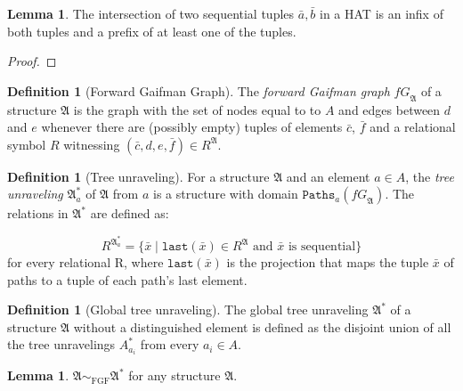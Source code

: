 \documentclass[draft]{scrartcl}
\theoremstyle{definition}
\newtheorem{definition}[theorem]{Definition}
\newtheorem{lemma}[theorem]{Lemma}
\newcommand{\last}[1]{\mathtt{last}(#1)}
\begin{document}
\begin{lemma}\label{lemma-seq-intersection}
The intersection of two sequential tuples $\bar{a}, \bar{b}$ in a HAT is an infix of both tuples and a prefix of at least one of the tuples.
\end{lemma}

\begin{proof}
\end{proof}

\begin{definition}[Forward Gaifman Graph]
The \emph{forward Gaifman graph} $\mathit{fG}_\mathfrak{A}$ of a structure $\mathfrak{A}$ is the graph with the set of nodes equal to to $A$ and edges between $d$ and $e$ whenever there are (possibly empty) tuples of elements $\bar{c}$, $\bar{f}$ and a relational symbol $R$ witnessing $(\bar{c}, d, e, \bar{f}) \in R^{\mathfrak{A}}$.
\end{definition}

\begin{definition}[Tree unraveling]
For a structure $\mathfrak{A}$ and an element $a \in A$, the \emph{tree unraveling} $\mathfrak{A}^*_a$ of $\mathfrak{A}$ from $a$ is a structure with domain $\mathtt{Paths}_a(\mathit{fG}_\mathfrak{A})$. The relations in $\mathfrak{A}^*$ are defined as:

\[
R^{\mathfrak{A}^*_a} = \{ \bar{x} \mid \text{$\last{\bar{x}} \in R^{\mathfrak{A}}$ and $\bar{x}$ is sequential} \}
\]
for every relational R, where $\last{\bar{x}}$ is the projection that maps the tuple $\bar{x}$ of paths to a tuple of each path's last element.
\end{definition}

\begin{definition}[Global tree unraveling]
The global tree unraveling $\mathfrak{A}^*$ of a structure $\mathfrak{A}$ without a distinguished element is defined as the disjoint union of all the tree unravelings $A^*_{a_i}$ from every $a_i \in A$.
\end{definition}

\begin{lemma}
$\mathfrak{A} \sim_{\textrm{FGF}} \mathfrak{A}^*$ for any structure $\mathfrak{A}$.
\end{lemma}
\end{document}
